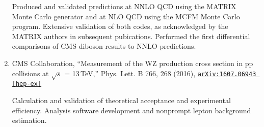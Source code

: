 \documentclass[a4paper]{article}
\begin{document}
\begin{enumerate}
    Produced and validated predictions at NNLO QCD using the MATRIX Monte Carlo generator and at NLO QCD using the MCFM Monte Carlo program.
    Extensive validation of both codes, as acknowledged by the MATRIX authors in subsequent pubications.
    Performed the first differential comparisons of CMS diboson results to NNLO predictions.

  \item CMS Collaboration, ``Measurement of the WZ production cross section in pp collisions at $\sqrt{s}$ = 13\,TeV,''
Phys. Lett. B 766, 268 (2016), \href{https://arxiv.org/abs/1607.06943}{\texttt{arXiv:1607.06943 [hep-ex]}}

    Calculation and validation of theoretical acceptance and experimental efficiency. 
    Analysis software development and nonprompt lepton background estimation.
\end{enumerate}
\end{document}
